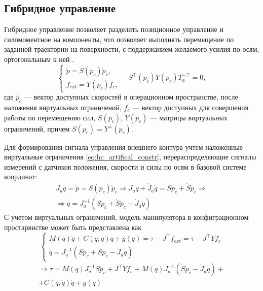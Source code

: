 \subsection{Гибридное управление}
Гибридное управление позволяет разделить позиционное управление и силомоментное на компоненты, что позволяет выполнять перемещение по заданной траектории на поверхности, с поддержанием желаемого усилия по осям, ортогональным к ней \cite{Handbook}.
\begin{equation}
  \begin{cases}
    \dot{p} =  S(p_c)\dot{p}_c,\\
    f_{ext} = Y(p_c)f_c,
  \end{cases} \quad  S^\top(p_c)Y(p_c)T_a^{-\top} = 0,
  \label{eq:hc_artifical_constr}
\end{equation}
где $\dot{p}_c$ --- вектор доступных скоростей в операционном пространстве, после наложения виртуальных ограничений, $f_c$ --- вектор доступных для совершения работы по перемещению сил, $S(p_c)$, $Y(p_c)$ --- матрицы виртуальных ограничений, причем $S(p_c) = Y^\perp(p_c)$.

Для формирования сигнала управления внешнего контура учтем наложенные виртуальные ограничения \eqref{eq:hc_artifical_constr}, перераспределяющие сигналы измерений с датчиков положения, скорости и силы по осям в базовой системе координат:
\begin{equation}
  \begin{split}
    J_a\dot{q} = \dot{p} = S(p_c)\dot{p}_c \Rightarrow J_a\ddot{q} + \dot{J}_a\dot{q} = S\ddot{p}_c + \dot{S}\dot{p}_c \Rightarrow \\
    \Rightarrow \ddot{q} = J_a^{-1}\left( S\ddot{p}_c + \dot{S}\dot{p}_c - \dot{J}_a\dot{q} \right)
  \end{split}
\end{equation}
С учетом виртуальных ограничений, модель манипулятора в конфиграционном простарвнстве может быть представлена как
\begin{equation}
  \begin{cases}
      M(q)\ddot{q} + C(q,\dot{q})\dot{q} + g(q)  = \tau - J^\top f_{ext} = \tau - J^\top Yf_c\\
      \ddot{q} = J_a^{-1}\left( S\ddot{p}_c + \dot{S}\dot{p}_c - \dot{J}_a\dot{q} \right)
    \end{cases}
\end{equation}
\begin{equation}
  \begin{split}
      \Rightarrow \tau = M(q) J_a^{-1} S \ddot{p}_c + J^\top Y f_c  + M(q) J_a^{-1}\left(\dot{S}\dot{p}_c - \dot{J}_a\dot{q} \right)+ \\+ C(q,\dot{q})\dot{q} + g(q)
  \end{split}
  \label{eq:hc_constr_model}
\end{equation}


